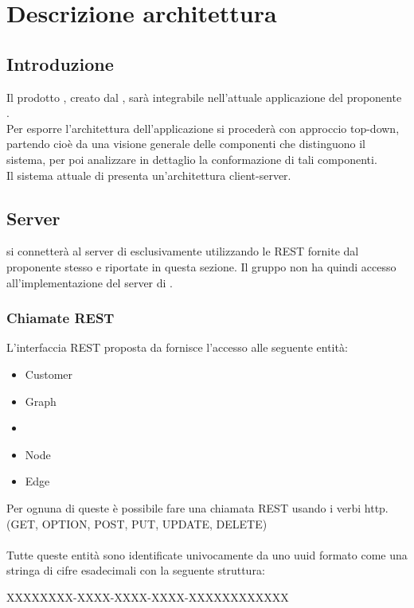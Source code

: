 \newpage

\section{Descrizione architettura}
\label{descrizione_architettura}
\subsection{Introduzione}
Il prodotto \progetto{}, creato dal  \zephyrus{}, sarà integrabile nell'attuale applicazione del proponente \riskapp{}.
\\Per esporre l'architettura dell'applicazione si procederà con approccio top-down, partendo cioè da una visione generale delle componenti che distinguono il sistema, per poi analizzare in dettaglio la conformazione di tali componenti.
\\Il sistema attuale di \riskapp{} presenta un'architettura client-server.
\subsection{Server}
\progetto{} si connetterà al server di \riskapp{} esclusivamente utilizzando le  REST fornite dal proponente stesso e riportate in questa sezione. Il gruppo non ha quindi accesso all'implementazione del server di \riskapp{}.
\subsubsection{Chiamate REST}
L'interfaccia REST proposta da \riskapp{} fornisce l'accesso alle seguente entità:
\begin{itemize}
	\item Customer
	\item Graph
	\item {}
	\item Node
	\item Edge
\end{itemize}
Per ognuna di queste è possibile fare una chiamata REST usando i verbi http. (GET, OPTION, POST, PUT, UPDATE, DELETE)\\\\
Tutte queste entità sono identificate univocamente da uno uuid formato come una stringa di cifre esadecimali con la seguente struttura:
\begin{center}
	XXXXXXXX-XXXX-XXXX-XXXX-XXXXXXXXXXXX
\end{center}

